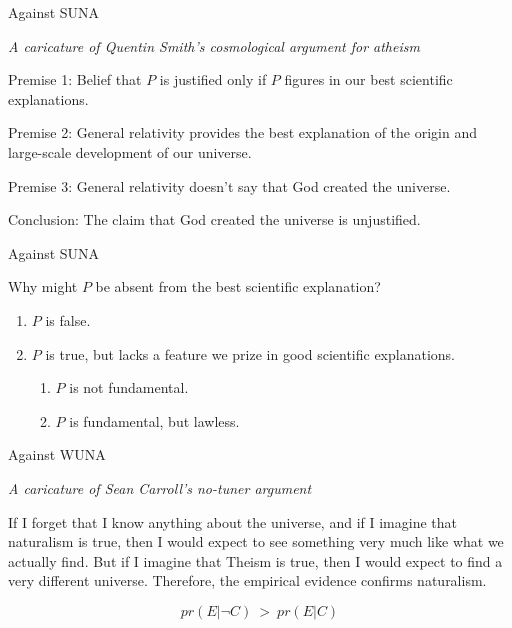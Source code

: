 \documentclass{beamer}
\begin{document}
\begin{frame}{Against SUNA}

  \textit{A caricature of Quentin Smith's cosmological argument for
    atheism}


  \bigskip Premise 1: Belief that $P$ is justified only if $P$ figures
  in our best scientific explanations.

  \smallskip Premise 2: General relativity provides the best
  explanation of the origin and large-scale development of our
  universe.

  \smallskip Premise 3: General relativity doesn't say that God
  created the universe.

  \smallskip Conclusion: The claim that God created the universe is
  unjustified.



\end{frame}

\begin{frame}{Against SUNA}

  Why might $P$ be absent from the best scientific explanation?

\begin{enumerate}
\item $P$ is false.
\item $P$ is true, but lacks a feature we prize in good scientific explanations.
\begin{enumerate}
\item $P$ is not fundamental.
\item $P$ is fundamental, but lawless. \end{enumerate} \end{enumerate}

\end{frame}


\begin{frame}{Against WUNA}

  \textit{A caricature of Sean Carroll's no-tuner argument}

  \bigskip If I forget that I know anything about the universe, and if
  I imagine that naturalism is true, then I would expect to see
  something very much like what we actually find.  But if I imagine
  that Theism is true, then I would expect to find a very different
  universe.  Therefore, the empirical evidence confirms naturalism.

\bigskip 
\[ 
  pr(E|\neg C) \: > \: pr(E|C) \]

\end{frame}
\end{document}
